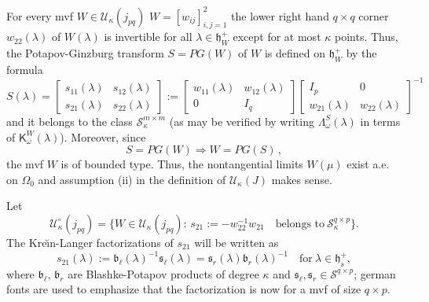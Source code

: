 \documentclass[12pt,twoside,a4paper]{amsart}
\theoremstyle{definition}
\numberwithin{equation}{section}
\begin{document}
For every mvf $W\in{{\mathcal U}}_\kappa(j_{pq})$ 
$W=[w_{ij}]_{i,j=1}^2$
the lower right hand $q\times q$ corner
$w_{22}(\lambda)$ of $W(\lambda)$
is invertible for all $\lambda\in{{\mathfrak h}}_W^+$ except
for at most $\kappa$ points. Thus, the Potapov-Ginzburg transform
$S=PG(W)$ of $W$ is  defined on ${{\mathfrak h}}_W^+$ by the formula
\begin{equation}\label{PGtrans}
    S(\lambda)=\left[\begin{array}{cc}
      s_{11}(\lambda) & s_{12}(\lambda) \\
      s_{21}(\lambda) & s_{22}(\lambda)
    \end{array}      \right] 
    :=\left[\begin{array}{cc}
      w_{11}(\lambda) & w_{12}(\lambda) \\
      0 & I_q
    \end{array}      \right]
    \left[\begin{array}{cc}
            I_p &       0\\
      w_{21}(\lambda) & w_{22}(\lambda)
    \end{array}      \right]^{-1}
\end{equation}
and it belongs to the class ${\mathcal S}_\kappa^{m\times m}$ (as may be
verified by writing ${\mathsf \Lambda}^{S}_\omega({\lambda})$ in terms of
${\mathsf K}^W_\omega({\lambda})$). Moreover, since
\begin{equation}
\label{eq:jul4a7}
S=PG(W)\Longrightarrow W=PG(S)\,,
\end{equation}
the mvf $W$ is of bounded type. Thus, the nontangential limits $W(\mu)$ exist
a.e. on $\Omega_0$ and  assumption (ii) in the definition of ${{\mathcal U}}_\kappa(J)$
makes sense.

Let
\begin{equation}
\label{eq:11.10}
{{\mathcal U}}_\kappa^\circ(j_{pq})=\{W\in{{\mathcal U}}_\kappa(j_{pq}):\, s_{21}:=-w_{22}^{-1}w_{21}\quad
\text{belongs to}\  {\mathcal S}_\kappa^{q\times p}\}.
\end{equation}
The Kre\u{\i}n-Langer factorizations of  $s_{21}$ will be written as
\begin{equation}\label{eq:0.4}
    s_{21}(\lambda):={{\mathfrak b}}_{\ell}(\lambda)^{-1}{{\mathfrak s}}_{\ell}(\lambda)
={{\mathfrak s}}_r(\lambda){{\mathfrak b}}_r(\lambda)^{-1}\quad\text{for}\ \lambda\in{{\mathfrak h}}_s^+,
\end{equation}
where ${{\mathfrak b}}_{\ell}$, ${{\mathfrak b}}_{r}$ are Blashke-Potapov products of degree
$\kappa$ and ${{\mathfrak s}}_{\ell},{{\mathfrak s}}_r\in {\mathcal S}^{q\times p}$;
german fonts are used to emphasize
that the factorization is now for a mvf of size ${q\times p}$.
\end{document}
